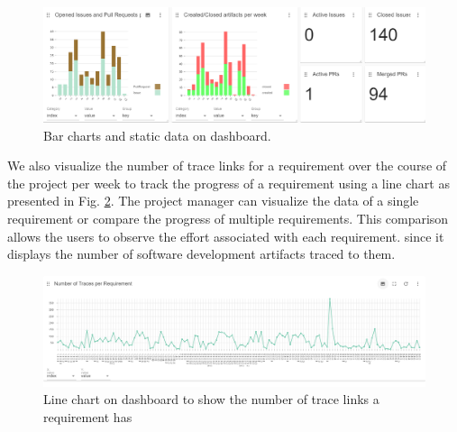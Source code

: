 

\begin{figure}[hbt]
    \centering
    \includegraphics[width=.9\linewidth]{figs/dashboard-barcharts.png}
    \caption{Bar charts and static data on dashboard.}
    \label{fig:barcharts}
\end{figure}

We also visualize the number of trace links for a requirement over the course of the project per week to track the progress of a requirement using a line chart as presented in Fig. \ref{fig:linechart}. The project manager can visualize the data of a single requirement or compare the progress of multiple requirements. %
This comparison allows the users to observe the effort associated with each requirement.%
since it displays the number of software development artifacts traced to them.

\begin{figure}[htb]
    \centering
    \includegraphics[width=.9\linewidth]{figs/linechart.png}
    \caption{Line chart on dashboard to show the number of trace links a requirement has}
    \label{fig:linechart}
\end{figure}

